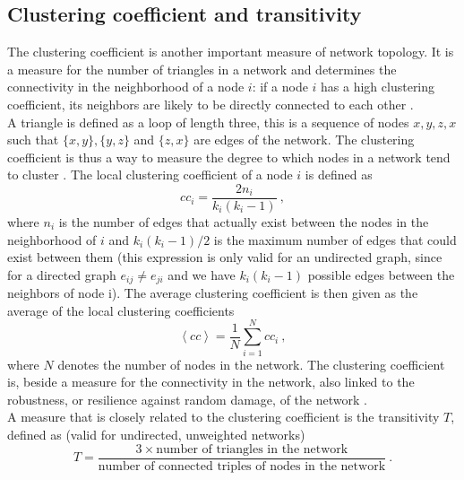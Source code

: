 \documentclass[11 pt , letterpaper , twoside , openright]{book}
\begin{document}
\subsection{Clustering coefficient and transitivity}

The clustering coefficient is another important measure of network topology. It is a measure for the number of triangles in a network and determines the connectivity in the neighborhood of a node $i$: if a node $i$ has a high clustering coefficient, its neighbors are likely to be directly connected to each other \cite{Li2017}. \\
\newline
A triangle is defined as a loop of length three, this is a sequence of nodes $x, y, z, x$ such that $\{x, y\}, \{y, z\}$ and $\{z, x\}$ are edges of the network. The clustering coefficient is thus a way to measure the degree to which nodes in a network tend to cluster \cite{Li2017}. The local clustering coefficient of a node $i$ is defined as \cite{Mata2020}
\begin{equation}\label{clus}
	cc_i = \frac{2n_i}{k_i(k_i-1)} \ ,
\end{equation}
where $n_i$ is the number of edges that actually exist between the nodes in the neighborhood of $i$ and $k_i(k_i-1)/2$ is the maximum number of edges that could exist between them (this expression is only valid for an undirected graph, since for a directed graph $e_{ij} \neq e_{ji}$ and we have $k_i(k_i-1)$ possible edges between the neighbors of node i). %
The average clustering coefficient is then given as the average of the local clustering coefficients \cite{Newman2003}
\begin{equation}\label{avClus}
	\left<cc\right> = \frac{1}{N}\sum_{i = 1}^N cc_i \ ,
\end{equation}
where $N$ denotes the number of nodes in the network. The clustering coefficient is, beside a measure for the connectivity in the network, also linked to the robustness, or resilience against random damage,  of the network \cite{Heer2020}\cite{Iyer2013}\cite{Li2017}. \\
\newline
A measure that is closely related to the clustering coefficient is the transitivity $T$, defined as (valid for undirected, unweighted networks) \cite{F.Costa2007}\cite{Newman2003}
\begin{equation}\label{globalTrans}
	T = \frac{3 \times \text{number of triangles in the network}}{\text{number of connected triples of nodes in the network}} \ .
\end{equation}
\end{document}
